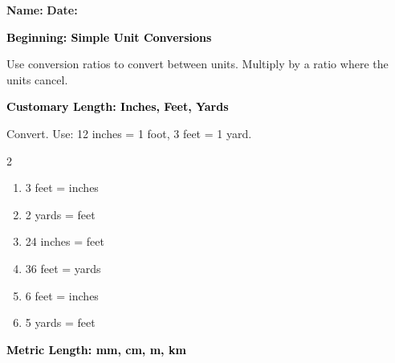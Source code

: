 \documentclass[12pt, letterpaper, fleqn]{article}
\newcommand{\blank}{\underline{\hspace{2.2cm}}}
\begin{document}
\textbf{Name:} \underline{\hspace{5cm}}
\hfill
\textbf{Date:} \underline{\hspace{3cm}}\\

\begin{tcolorbox}[colback=customteal!20]
    \large\textcolor{black}{\textbf{Beginning: Simple Unit Conversions}}
\end{tcolorbox}

\vspace{3mm}

\noindent
Use conversion ratios to convert between units. Multiply by a ratio where the units cancel.

\vspace{4mm}

\begin{tcolorbox}[colback=customteal!20]
\large\textcolor{black}{\textbf{Customary Length: Inches, Feet, Yards}}
\end{tcolorbox}

\noindent
Convert. Use: 12 inches = 1 foot, 3 feet = 1 yard.

\vspace{3mm}

\begin{multicols}{2}
\begin{enumerate}[itemsep=1.3cm, leftmargin=0.6cm]
\item 3 feet = \blank \; inches
\item 2 yards = \blank \; feet
\item 24 inches = \blank \; feet
\item 36 feet = \blank \; yards
\item 6 feet = \blank \; inches
\item 5 yards = \blank \; feet
\end{enumerate}
\end{multicols}

\newpage

\begin{tcolorbox}[colback=customteal!20]
\large\textcolor{black}{\textbf{Metric Length: mm, cm, m, km}}
\end{tcolorbox}
\end{document}
